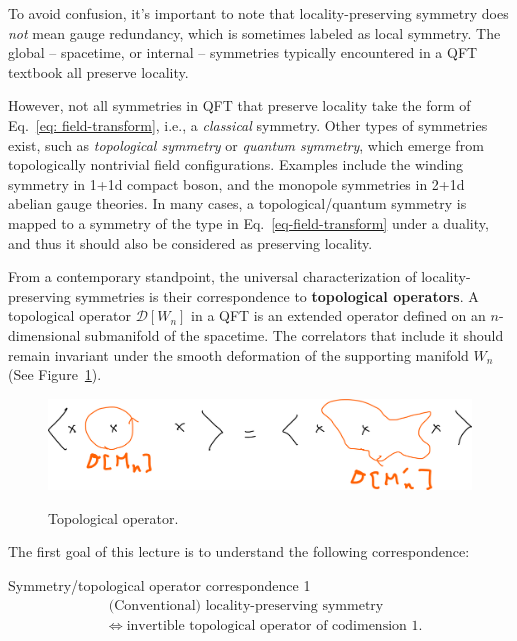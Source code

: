 \documentclass[11pt,toc=bibliography]{scrbook}
\numberwithin{equation}{section}
\begin{document}

\begin{note}{}
  To avoid confusion, it's important to note that locality-preserving symmetry does \emph{not} mean gauge redundancy, which is sometimes labeled as local symmetry. The global -- spacetime, or internal -- symmetries typically encountered in a QFT textbook all preserve locality.
\end{note}

However, not all symmetries in QFT that preserve locality take the form of Eq.~\eqref{eq: field-transform}, i.e., a \emph{classical} symmetry. Other types of symmetries exist, such as \emph{topological symmetry} or \emph{quantum symmetry}, which emerge from topologically nontrivial field configurations. Examples include the winding symmetry in 1+1d compact boson, and the monopole symmetries in 2+1d abelian gauge theories. In many cases, a topological/quantum symmetry is mapped to a symmetry of the type in Eq.~\eqref{eq-field-transform} under a duality, and thus it should also be considered as preserving locality.

From a contemporary standpoint, the universal characterization of locality-preserving symmetries is their correspondence to \textbf{topological operators}. A topological operator \(\mathcal{D}[W_n]\) in a QFT is an extended operator defined on an \(n\)-dimensional submanifold of the spacetime. The correlators that include it should remain invariant under the smooth deformation of the supporting manifold \(W_n\) (See Figure~\ref{fig-TopOpsDeform}).

\begin{figure}[t]
  {\centering \includegraphics[width=\textwidth]{figures/TopOpsDeform.png} }
  \caption{\label{fig-TopOpsDeform}Topological operator.}
\end{figure}

The first goal of this lecture is to understand the following correspondence:

\begin{important}{Symmetry/topological operator correspondence 1}
  \begin{equation}
    \begin{split}
       & \text{(Conventional) locality-preserving symmetry} \\
       & \Longleftrightarrow\;
      \text{invertible topological operator of codimension 1.}
    \end{split}
    \label{eq: conv-STO-corresp}
  \end{equation}
\end{important}
\end{document}
